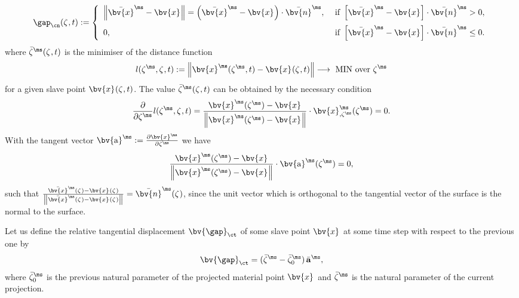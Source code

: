 \begin{equation*}
\gap_{\cn}(\zeta^{\sl},t):=
\left\{
\begin{array}{ll}
\left\| \bar{\bv{x}}^{\ms} - \bv{x}^{\sl} \right\| =   
\left( \bar{\bv{x}}^{\ms} - \bv{x}^{\sl} \right)\cdot\bar{\bv{n}}^{\ms}, &\mbox{ if } 
\left[ \bar{\bv{x}}^{\ms} - \bv{x}^{\sl} \right]\cdot\bar{\bv{n}}^{\ms} > 0, \\[2ex]
 0,& \mbox{ if } \left[ \bar{\bv{x}}^{\ms} - \bv{x}^{\sl} \right]\cdot\bar{\bv{n}}^{\ms} \leq 0.
\end{array}
\right.
\end{equation*}
where $\bar{\zeta}^{\ms}(\zeta^{\sl},t)$ is the minimiser of the distance function
\begin{equation*}\label{PenetrationFunction}
l(\zeta^{\ms},\zeta^{\sl},t):=\left\|  \bv{x}^{\ms}(\zeta^{\ms},t)-\bv{x}^{\sl}(\zeta^{\sl},t) \right\|\longrightarrow \mbox{ MIN over } \zeta^{\ms}
\end{equation*}
for a given slave point $\bv{x}^{\sl}(\zeta^{\sl},t)$. The value $\bar{\zeta}^{\ms}(\zeta^{\sl},t)$ can be obtained by the necessary condition
\begin{equation*}
\frac{\partial }{\partial \zeta^{\ms}} l(\zeta^{\ms},\zeta^{\sl},t)=\frac{\bv{x}^{\ms}(\zeta^{\ms})-\bv{x}^{\sl}}{\left\| \bv{x}^{\ms}(\zeta^{\ms})-\bv{x}^{\sl}\right\|}\cdot\bv{x}^{\ms}_{,\zeta^{\ms}}(\zeta^{\ms})=0.
\end{equation*}
With the tangent vector $\bv{\mathrm{a}}^{\ms}:=\frac{\partial \bv{x}^{\ms}}{\partial \zeta^{\ms}}$ we have
\begin{equation*}\label{PenetrationPoint0}
\frac{\bv{x}^{\ms}(\zeta^{\ms})-\bv{x}^{\sl}}{\left\| \bv{x}^{\ms}(\zeta^{\ms})-\bv{x}^{\sl}\right\|} \cdot \bv{\mathrm{a}}^{\ms}(\zeta^{\ms}) =0,
\end{equation*}
such that  $\frac{\bar{\bv{x}}^{\ms}(\zeta^{\sl})-\bv{x}^{\sl}(\zeta^{\sl})}{\left\|\bar{\bv{x}}^{\ms}(\zeta^{\sl})-\bv{x}^{\sl}(\zeta^{\sl})\right\|}=\bar{\bv{n}}^{\ms}(\zeta^{\sl})$, since the unit vector which is orthogonal to the tangential vector of the surface is the normal to the surface.

Let us define the relative tangential displacement $\bv{\gap}_{\ct}$ of some slave point $\bv{x}^{\sl}$ at some time step with respect to the previous one by
\begin{equation*}
\bv{\gap}_{\ct} = (\bar{\zeta}^{\ms} - \bar{\zeta}^{\ms}_0) \, \bar{\mathbf{a}}^{\ms},
\end{equation*}
where $\bar{\zeta}^{\ms}_0$ is the previous natural parameter of the projected material point $\bv{x}^{\sl}$ and $\bar{\zeta}^{\ms}$ is the natural parameter of the current projection.

